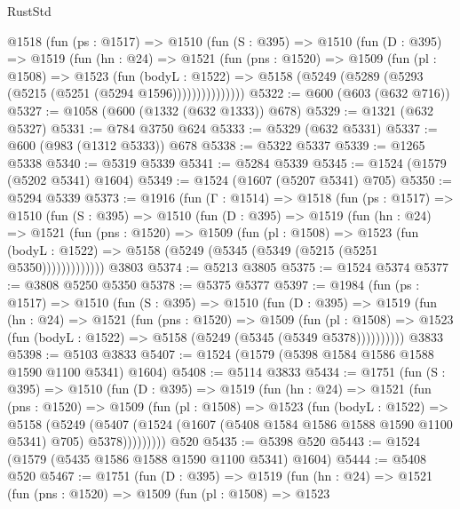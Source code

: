 \begin{lexlean}{RustStd}
\begin{coremodule}
      @1518
        (fun (ps : @1517) =>
        @1510
          (fun (S : @395) =>
          @1510
            (fun (D : @395) =>
            @1519
              (fun (hn : @24) =>
              @1521
                (fun (pns : @1520) =>
                @1509
                  (fun (pl : @1508) =>
                  @1523
                    (fun (bodyL : @1522) =>
                    @5158 (@5249 (@5289 (@5293 (@5215 (@5251 (@5294 @1596)))))))))))))))
@5322 := @600 (@603 (@632 @716))
@5327 := @1058 (@600 (@1332 (@632 @1333)) @678)
@5329 := @1321 (@632 @5327)
@5331 := @784 @3750 @624
@5333 := @5329 (@632 @5331)
@5337 := @600 (@983 (@1312 @5333)) @678
@5338 := @5322 @5337
@5339 := @1265 @5338
@5340 := @5319 @5339
@5341 := @5284 @5339
@5345 := @1524 (@1579 (@5202 @5341) @1604)
@5349 := @1524 (@1607 (@5207 @5341) @705)
@5350 := @5294 @5339
@5373 := @1916
    (fun (Γ : @1514) =>
    @1518
      (fun (ps : @1517) =>
      @1510
        (fun (S : @395) =>
        @1510
          (fun (D : @395) =>
          @1519
            (fun (hn : @24) =>
            @1521
              (fun (pns : @1520) =>
              @1509
                (fun (pl : @1508) =>
                @1523
                  (fun (bodyL : @1522) =>
                  @5158 (@5249 (@5345 (@5349 (@5215 (@5251 @5350)))))))))))))
    @3803
@5374 := @5213 @3805
@5375 := @1524 @5374
@5377 := @3808 @5250 @5350
@5378 := @5375 @5377
@5397 := @1984
    (fun (ps : @1517) =>
    @1510
      (fun (S : @395) =>
      @1510
        (fun (D : @395) =>
        @1519
          (fun (hn : @24) =>
          @1521
            (fun (pns : @1520) =>
            @1509
              (fun (pl : @1508) =>
              @1523 (fun (bodyL : @1522) => @5158 (@5249 (@5345 (@5349 @5378))))))))))
    @3833
@5398 := @5103 @3833
@5407 := @1524 (@1579 (@5398 @1584 @1586 @1588 @1590 @1100 @5341) @1604)
@5408 := @5114 @3833
@5434 := @1751
    (fun (S : @395) =>
    @1510
      (fun (D : @395) =>
      @1519
        (fun (hn : @24) =>
        @1521
          (fun (pns : @1520) =>
          @1509
            (fun (pl : @1508) =>
            @1523
              (fun (bodyL : @1522) =>
              @5158
                (@5249
                  (@5407
                    (@1524 (@1607 (@5408 @1584 @1586 @1588 @1590 @1100 @5341) @705) @5378)))))))))
    @520
@5435 := @5398 @520
@5443 := @1524 (@1579 (@5435 @1586 @1588 @1590 @1100 @5341) @1604)
@5444 := @5408 @520
@5467 := @1751
    (fun (D : @395) =>
    @1519
      (fun (hn : @24) =>
      @1521
        (fun (pns : @1520) =>
        @1509
          (fun (pl : @1508) =>
          @1523

\end{coremodule}
\end{lexlean}
